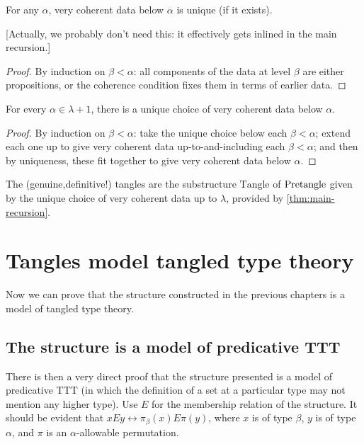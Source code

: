 \begin{lemma}
  \label{lem:very-coherent-data-unique}
  For any $\alpha$, very coherent data below $\alpha$ is unique (if it exists).

  [Actually, we probably don’t need this: it effectively gets inlined in the main recursion.]
\end{lemma}
\begin{proof}
  By induction on $\beta < \alpha$: all components of the data at level $\beta$ are either propositions, or the coherence condition fixes them in terms of earlier data.
\end{proof}

\begin{theorem}
  \label{thm:main-recursion}
    For every $\alpha \in \lambda + 1$, there is a unique choice of very coherent data below $\alpha$.
\end{theorem}
\begin{proof}
  By induction on $\beta < \alpha$: take the unique choice below each $\beta < \alpha$; extend each one up to give very coherent data up-to-and-including each $\beta < \alpha$; and then by uniqueness, these fit together to give very coherent data below $\alpha$.
\end{proof}

\newcommand{\Tangle}{\mathrm{Tangle}}
\begin{definition}
  \label{def:tangle-completed}
  The (genuine,definitive!) tangles are the substructure $\Tangle$ of $\mathrm{Pretangle}$ given by the unique choice of very coherent data up to $\lambda$, provided by \cref{thm:main-recursion}.
\end{definition}

\newpage

\chapter{Tangles model tangled type theory}

Now we can prove that the structure constructed in the previous chapters is a model of tangled type theory.

\section{The structure is a model of predicative TTT}

There is then a very direct proof that the structure presented is a model of predicative TTT (in which the definition of a set at a particular type may not mention any higher type).  Use $E$ for the membership relation of the structure.  It should be evident that $x E y \leftrightarrow \pi_\beta(x) E \pi(y)$,
where $x$ is of type $\beta$, $y$ is of type $\alpha$, and $\pi$ is an $\alpha$-allowable permutation.

